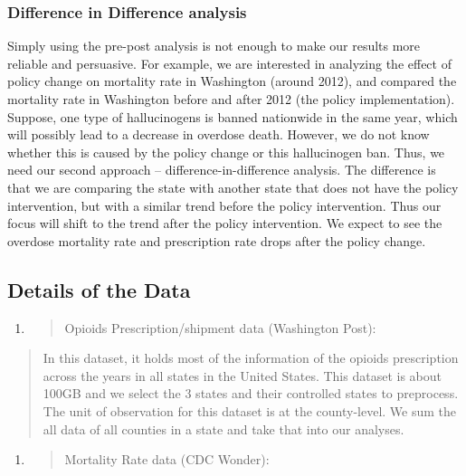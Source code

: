 \documentclass{article}
\begin{document}
\hypertarget{difference-in-difference-analysis}{%
\subsubsection{Difference in Difference
analysis}\label{difference-in-difference-analysis}}

Simply using the pre-post analysis is not enough to make our results
more reliable and persuasive. For example, we are interested in
analyzing the effect of policy change on mortality rate in Washington
(around 2012), and compared the mortality rate in Washington before and
after 2012 (the policy implementation). Suppose, one type of
hallucinogens is banned nationwide in the same year, which will possibly
lead to a decrease in overdose death. However, we do not know whether
this is caused by the policy change or this hallucinogen ban. Thus, we
need our second approach -- difference-in-difference analysis. The
difference is that we are comparing the state with another state that
does not have the policy intervention, but with a similar trend before
the policy intervention. Thus our focus will shift to the trend after
the policy intervention. We expect to see the overdose mortality rate
and prescription rate drops after the policy change.

\hypertarget{details-of-the-data}{%
\subsection{Details of the Data}\label{details-of-the-data}}

\begin{enumerate}
\def\labelenumi{\arabic{enumi}.}
\item
  \begin{quote}
  Opioids Prescription/shipment data (Washington Post):
  \end{quote}
\end{enumerate}

\begin{quote}
In this dataset, it holds most of the information of the opioids
prescription across the years in all states in the United States. This
dataset is about 100GB and we select the 3 states and their controlled
states to preprocess. The unit of observation for this dataset is at the
county-level. We sum the all data of all counties in a state and take
that into our analyses.
\end{quote}

\begin{enumerate}
\def\labelenumi{\arabic{enumi}.}
\setcounter{enumi}{1}
\item
  \begin{quote}
  Mortality Rate data (CDC Wonder):
  \end{quote}
\end{enumerate}
\end{document}
